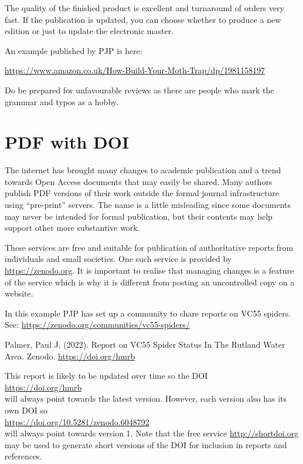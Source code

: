 \documentclass{article}
\begin{document}
The quality of the finished product is excellent and turnaround of orders very fast.  If the publication is updated, you can choose whether to produce a new edition or just to update the electronic master.

An example published by PJP is here:

\url{https://www.amazon.co.uk/How-Build-Your-Moth-Trap/dp/1981158197}

Do be prepared for unfavourable reviews as there are people who mark the grammar and typos as a hobby.

\section{PDF with DOI}

The internet has brought many changes to academic publication and a trend towards Open Access documents that may easily be shared. Many authors publish PDF versions of their work outside the formal journal infrastructure using \enquote{pre-print} servers. The name is a little misleading since some documents may never be intended for formal publication, but their contents may help support other more substantive work.

These services are free and suitable for publication of authoritative reports from individuals and small societies. One such service is provided by \url{https://zenodo.org}.  It is important to realise that managing changes is a feature of the service which is why it is different from posting an uncontrolled copy on a website. 

In this example PJP has set up a community to share reports on VC55 spiders. \\
See: \url{https://zenodo.org/communities/vc55-spiders/} 

Palmer, Paul J. (2022). Report on VC55 Spider Status In The Rutland Water Area. Zenodo. \url{https://doi.org/hmrb}

This report is likely to be updated over time so the DOI \\ \url{https://doi.org/hmrb} \\will always point towards the latest version. However, each version also has its own DOI so \\
\url{https://doi.org/10.5281/zenodo.6048792} \\
 will always point towards version 1. Note that the free service \url{http://shortdoi.org}  may be used to generate short versions of the DOI for inclusion in reports and references.
 
\end{document}
